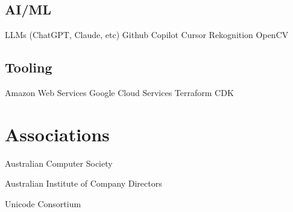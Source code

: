 \documentclass[]{tjd-cv}
\begin{document}
\begin{minipage}[t]{0.26\textwidth}
\vspace{8pt}
\subsection{AI/ML}
LLMs (ChatGPT, Claude, etc) \textbullet{}
Github Copilot \textbullet{}
Cursor \textbullet{}
Rekognition \textbullet{}
OpenCV

\vspace{8pt}
\subsection{Tooling}
Amazon Web Services \textbullet{}
Google Cloud Services \textbullet{}
Terraform \textbullet{}
CDK

\sectionsep


\section{Associations}
\vspace{\topsep}
\begin{tightemize}
\item Australian Computer Society
\item Australian Institute of Company Directors
\item Unicode Consortium
\end{tightemize}


%
%

\end{minipage}
\hfill
\end{document}
